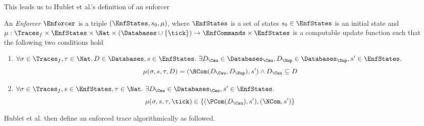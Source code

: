 This leads us to Hublet et al.'s \cite{whyenf, whyenf-2} definition of an enforcer
\begin{definition}
    \label{def:enforcer-triple}
    An \emph{Enforcer} $\Enforcer$ is a triple
    $\left(\EnfStates, s_0, \mu \right)$, where $\EnfStates$ is a set of states
    $s_0 \in \EnfStates$ is an initial state and
    $\mu : \Traces_f \times \EnfStates
    \times \Nat \times \left( \Databases \cup \left\{ \tick \right\} \right)
    \to \EnfCommands \times \EnfStates$
    is a computable update function such that the following two
    conditions hold
    \begin{enumerate}
        \item 
            $ \forall \sigma \in \Traces_f, \tau \in \Nat,
            D \in \Databases,
            s \in \EnfStates.~
            \exists D_\Cau \in \Databases_\Cau, D_\Sup \in \Databases_\Sup,
            s' \in \EnfStates.$
        \begin{equation*}
            \mu(\sigma,s,\tau, D)
            = (\RCom(D_\Cau,D_\Sup), s') \wedge D_\Cau \subseteq D
        \end{equation*}
        
        \item
            $\forall \sigma \in \Traces_f, s \in \EnfStates, \tau \in \Nat.~
            \exists D_\Cau \in \Databases_\Cau, s' \in \EnfStates.$
            \begin{equation*}
                \mu(\sigma,s,\tau,\tick)
                \in \{(\PCom(D_\Cau), s'), (\NCom,s')\}
            \end{equation*}
        
    \end{enumerate}
    
\end{definition}


Hublet et al. \cite{whyenf-2} then define an enforced trace algorithmically as followed.

